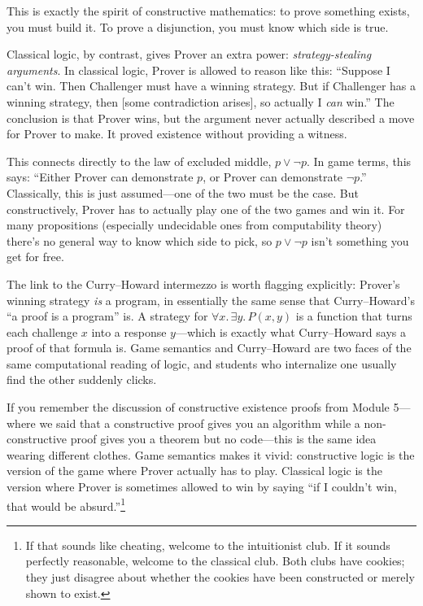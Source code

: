 \documentclass[11pt]{article}
\begin{document}
This is exactly the spirit of constructive mathematics: to prove something exists, you must build it. To prove a disjunction, you must know which side is true.

Classical logic, by contrast, gives Prover an extra power: \emph{strategy-stealing arguments}. In classical logic, Prover is allowed to reason like this: ``Suppose I can't win. Then Challenger must have a winning strategy. But if Challenger has a winning strategy, then [some contradiction arises], so actually I \emph{can} win.'' The conclusion is that Prover wins, but the argument never actually described a move for Prover to make. It proved existence without providing a witness.

This connects directly to the law of excluded middle, $p \vee \lnot p$. In game terms, this says: ``Either Prover can demonstrate $p$, or Prover can demonstrate $\lnot p$.'' Classically, this is just assumed---one of the two must be the case. But constructively, Prover has to actually play one of the two games and win it. For many propositions (especially undecidable ones from computability theory) there's no general way to know which side to pick, so $p \vee \lnot p$ isn't something you get for free.

The link to the Curry--Howard intermezzo is worth flagging explicitly: Prover's winning strategy \emph{is} a program, in essentially the same sense that Curry--Howard's ``a proof is a program'' is. A strategy for $\forall x.\,\exists y.\, P(x, y)$ is a function that turns each challenge $x$ into a response $y$---which is exactly what Curry--Howard says a proof of that formula is. Game semantics and Curry--Howard are two faces of the same computational reading of logic, and students who internalize one usually find the other suddenly clicks.

If you remember the discussion of constructive existence proofs from Module 5---where we said that a constructive proof gives you an algorithm while a non-constructive proof gives you a theorem but no code---this is the same idea wearing different clothes. Game semantics makes it vivid: constructive logic is the version of the game where Prover actually has to play. Classical logic is the version where Prover is sometimes allowed to win by saying ``if I couldn't win, that would be absurd.''\footnote{If that sounds like cheating, welcome to the intuitionist club. If it sounds perfectly reasonable, welcome to the classical club. Both clubs have cookies; they just disagree about whether the cookies have been constructed or merely shown to exist.}
\end{document}
